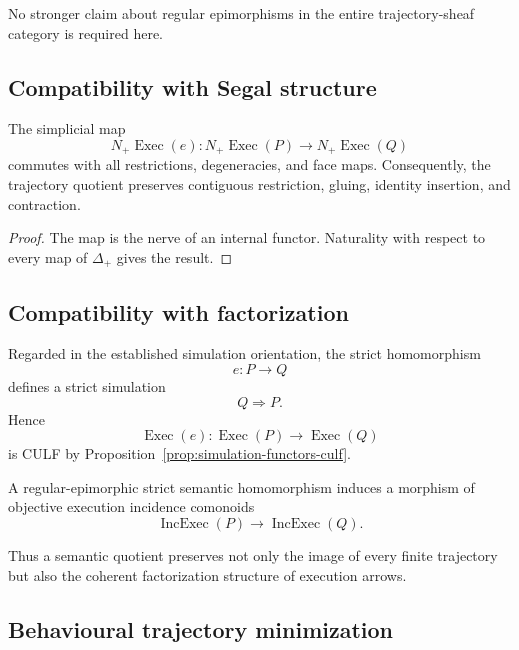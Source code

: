 No stronger claim about regular epimorphisms in the entire trajectory-sheaf
category is required here.

\subsection{Compatibility with Segal structure}
\label{subsec:quotient-segal-compatibility}

\begin{proposition}
\label{prop:strict-quotient-segal-compatibility}
The simplicial map
\[
    N_+\operatorname{Exec}(e):
    N_+\operatorname{Exec}(P)
    \longrightarrow
    N_+\operatorname{Exec}(Q)
\]
commutes with all restrictions, degeneracies, and face maps. Consequently,
the trajectory quotient preserves contiguous restriction, gluing, identity
insertion, and contraction.
\end{proposition}

\begin{proof}
The map is the nerve of an internal functor. Naturality with respect to every
map of \(\Delta_+\) gives the result.
\end{proof}

\subsection{Compatibility with factorization}
\label{subsec:quotient-factorization-compatibility}

Regarded in the established simulation orientation, the strict homomorphism
\[
    e:P\to Q
\]
defines a strict simulation
\[
    Q\Longrightarrow P.
\]
Hence
\[
    \operatorname{Exec}(e):
    \operatorname{Exec}(P)
    \to
    \operatorname{Exec}(Q)
\]
is CULF by
Proposition~\ref{prop:simulation-functors-culf}.

\begin{corollary}
\label{cor:quotients-preserve-factorization}
A regular-epimorphic strict semantic homomorphism induces a morphism of
objective execution incidence comonoids
\[
    \operatorname{IncExec}(P)
    \longrightarrow
    \operatorname{IncExec}(Q).
\]
\end{corollary}

Thus a semantic quotient preserves not only the image of every finite
trajectory but also the coherent factorization structure of execution
arrows.

\subsection{Behavioural trajectory minimization}
\label{subsec:behavioural-trajectory-minimization}

